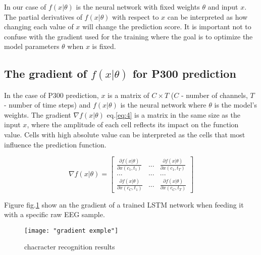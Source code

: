 \documentclass[]{report}
\begin{document}
In our case of $f(x|\theta)$ is the neural network with fixed weights $\theta$ and input $x$. The partial derivatives of $f(x|\theta)$ with respect to $x$ can be interpreted as how changing each value of $x$ will change the prediction score. It is important not to confuse with the gradient used for the training where the goal is to  optimize the model parameters $\theta$ when $x$ is fixed.


\subsection{The gradient of $f(x|\theta)$ for P300 prediction}
In the case of P300 prediction, $x$ is a matrix of $C\times{T}$ ($C$ - number of channels, $T$ -  number of time steps) and $f(x|\theta)$ is the neural network where $\theta$ is the model's weights. The gradient $\nabla{f(x|\theta)}$ eq.\ref{eq:4} is a matrix in the same size as the input $x$, where the amplitude of each cell reflects its impact on the function value. Cells with high absolute value can be interpreted as the cells that most influence the prediction 
function. 

\begin{equation}\label{eq:4}
\nabla f\left( {x|\theta } \right) = \left[ {\begin{array}{*{20}{c}}
	{\frac{{\partial f\left( {x|\theta } \right)}}{{\partial x\left( {{c_1},{t_1}} \right)}}}&{...}&{\frac{{\partial f\left( {x|\theta } \right)}}{{\partial x\left( {{c_1},{t_T}} \right)}}}\\
	{...}&{...}&{...}\\
	{\frac{{\partial f\left( {x|\theta } \right)}}{{\partial x\left( {{c_C},{t_1}} \right)}}}&{...}&{\frac{{\partial f\left( {x|\theta } \right)}}{{\partial x\left( {{c_C},{t_T}} \right)}}}
	\end{array}} \right]
\end{equation}







Figure fig.\ref{fig:gradient_example} show an the gradient of a trained LSTM network when feeding it with a specific raw EEG sample. 

\begin{figure}
	\texttt{[image: "gradient exmple"]}
	\caption{chacracter recognition results}
	\label{fig:gradient_example}
\end{figure}
\end{document}
